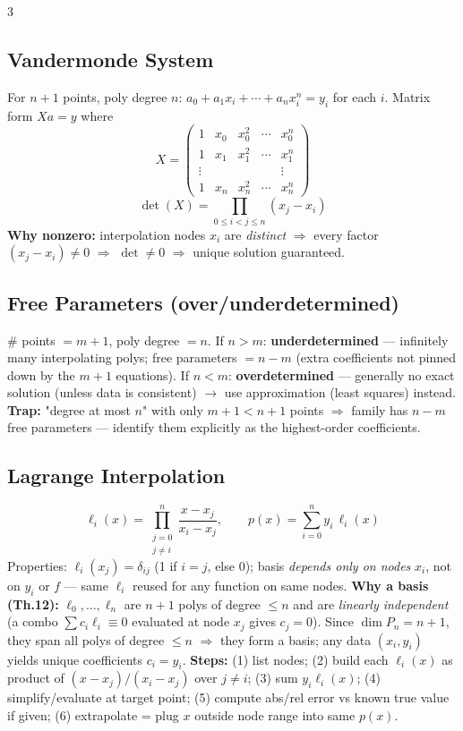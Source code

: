 \documentclass[9pt]{extarticle}
\newcommand{\hl}[1]{\textbf{\textcolor{BrickRed}{#1}}}
\begin{document}
\begin{multicols}{3}
\subsection{Vandermonde System}
For $n+1$ points, poly degree $n$: $a_0+a_1x_i+\cdots+a_nx_i^n=y_i$ for each $i$. Matrix form $Xa=y$ where
\begin{equation*}
X=\begin{pmatrix}1&x_0&x_0^2&\cdots&x_0^n\\ 1&x_1&x_1^2&\cdots&x_1^n\\ \vdots&&&&\vdots\\ 1&x_n&x_n^2&\cdots&x_n^n\end{pmatrix}
\end{equation*}
\begin{equation*}
\det(X)=\prod_{0\le i<j\le n}(x_j-x_i)
\end{equation*}
\hl{Why nonzero:} interpolation nodes $x_i$ are \emph{distinct} $\Rightarrow$ every factor $(x_j-x_i)\ne0$ $\Rightarrow$ $\det\ne0$ $\Rightarrow$ unique solution guaranteed.

\subsection{Free Parameters (over/underdetermined)}
\# points $=m+1$, poly degree $=n$. If $n>m$: \hl{underdetermined} — infinitely many interpolating polys; free parameters $=n-m$ (extra coefficients not pinned down by the $m+1$ equations). If $n<m$: \hl{overdetermined} — generally no exact solution (unless data is consistent) $\to$ use approximation (least squares) instead.
\hl{Trap:} "degree at most $n$" with only $m+1<n+1$ points $\Rightarrow$ family has $n-m$ free parameters — identify them explicitly as the highest-order coefficients.

\subsection{Lagrange Interpolation}
\begin{equation*}
\ell_i(x)=\prod_{\substack{j=0\\ j\ne i}}^{n}\frac{x-x_j}{x_i-x_j},\qquad p(x)=\sum_{i=0}^n y_i\,\ell_i(x)
\end{equation*}
Properties: $\ell_i(x_j)=\delta_{ij}$ (1 if $i=j$, else 0); basis \emph{depends only on nodes} $x_i$, not on $y_i$ or $f$ — same $\ell_i$ reused for any function on same nodes.
\hl{Why a basis (Th.12):} $\ell_0,\dots,\ell_n$ are $n{+}1$ polys of degree $\le n$ and are \emph{linearly independent} (a combo $\sum c_i\ell_i\equiv0$ evaluated at node $x_j$ gives $c_j=0$). Since $\dim P_n=n{+}1$, they span all polys of degree $\le n$ $\Rightarrow$ they form a basis; any data $(x_i,y_i)$ yields unique coefficients $c_i=y_i$.
\textbf{Steps:} (1) list nodes; (2) build each $\ell_i(x)$ as product of $(x-x_j)/(x_i-x_j)$ over $j\ne i$; (3) sum $y_i\ell_i(x)$; (4) simplify/evaluate at target point; (5) compute abs/rel error vs known true value if given; (6) extrapolate = plug $x$ outside node range into same $p(x)$.


\end{multicols}
\end{document}
